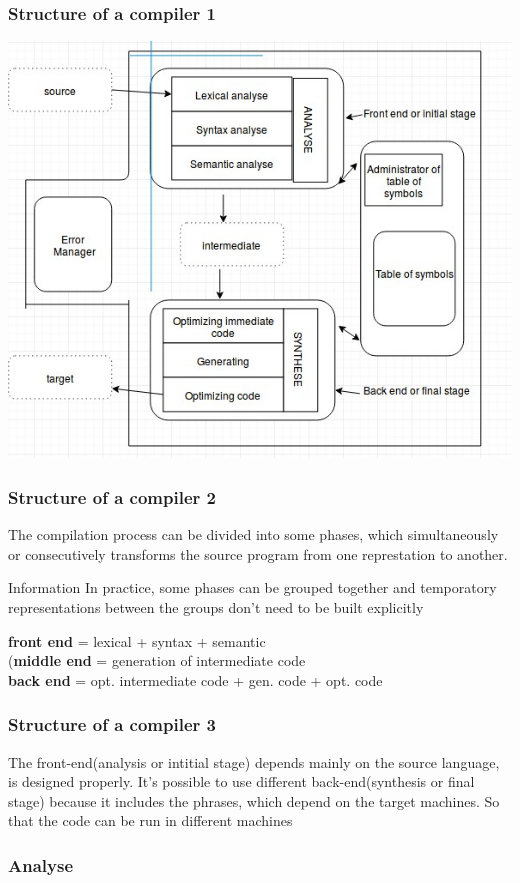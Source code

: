 \documentclass{beamer}
\begin{document}
\begin{frame}
\frametitle{Structure of a compiler 1}
\includegraphics[scale=0.5]{3.jpg}
\end{frame}
\begin{frame}
\frametitle{Structure of a compiler 2}
The compilation process can be divided into some phases, which simultaneously or consecutively transforms the source program from one represtation to another.
\begin{block}{Information}
In practice, some phases can be grouped together and temporatory representations between the groups don't need to be built explicitly
\end{block}
\textbf{front end }= lexical + syntax + semantic\\
(\textbf{middle end} = generation of intermediate code\\
\textbf{back end} = opt. intermediate code + gen. code + opt. code\\
\end{frame}
\begin{frame}
\frametitle{Structure of a compiler 3}
The front-end(analysis or intitial stage) depends mainly on the source language, is designed properly. It's possible to use different back-end(synthesis or final stage) because it includes the phrases, which depend on the target machines. So that the code can be run in different machines
\end{frame}
\begin{frame}
\frametitle{Analyse}
\end{frame}
\end{document}
